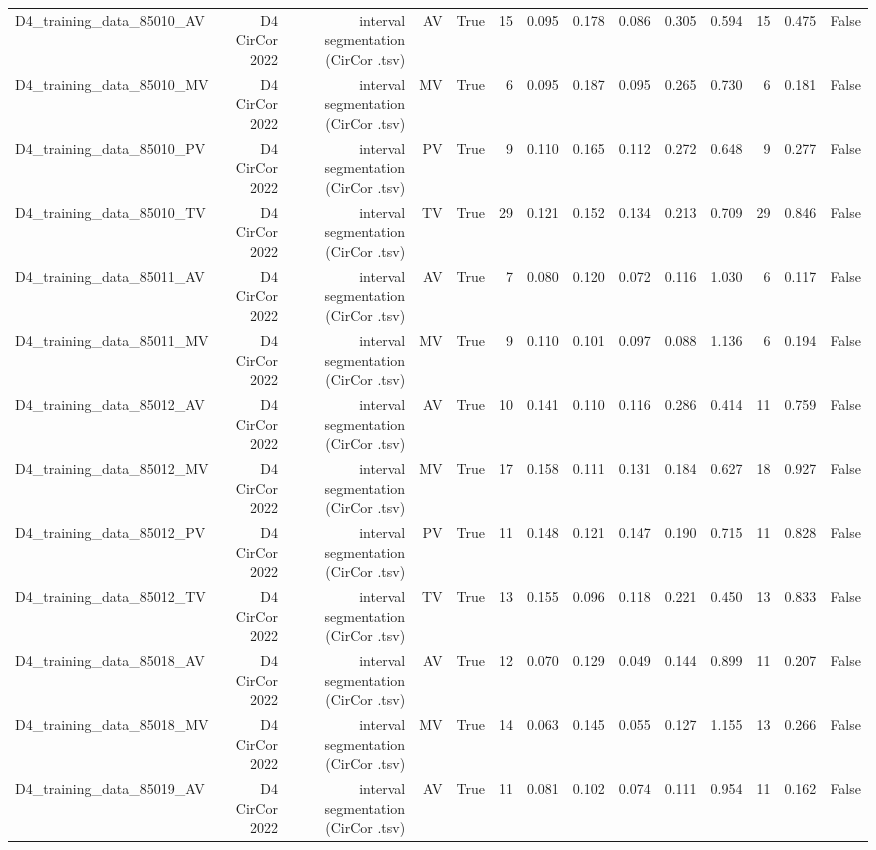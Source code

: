 \begin{table}[htbp]
\begin{tabular}{lrrrrrrrrrrrrr}
    D4\_training\_data\_85010\_AV & D4 CirCor 2022 & interval segmentation (CirCor .tsv) & AV & True & 15 & 0.095 & 0.178 & 0.086 & 0.305 & 0.594 & 15 & 0.475 & False \\
    D4\_training\_data\_85010\_MV & D4 CirCor 2022 & interval segmentation (CirCor .tsv) & MV & True & 6 & 0.095 & 0.187 & 0.095 & 0.265 & 0.730 & 6 & 0.181 & False \\
    D4\_training\_data\_85010\_PV & D4 CirCor 2022 & interval segmentation (CirCor .tsv) & PV & True & 9 & 0.110 & 0.165 & 0.112 & 0.272 & 0.648 & 9 & 0.277 & False \\
    D4\_training\_data\_85010\_TV & D4 CirCor 2022 & interval segmentation (CirCor .tsv) & TV & True & 29 & 0.121 & 0.152 & 0.134 & 0.213 & 0.709 & 29 & 0.846 & False \\
    D4\_training\_data\_85011\_AV & D4 CirCor 2022 & interval segmentation (CirCor .tsv) & AV & True & 7 & 0.080 & 0.120 & 0.072 & 0.116 & 1.030 & 6 & 0.117 & False \\
    D4\_training\_data\_85011\_MV & D4 CirCor 2022 & interval segmentation (CirCor .tsv) & MV & True & 9 & 0.110 & 0.101 & 0.097 & 0.088 & 1.136 & 6 & 0.194 & False \\
    D4\_training\_data\_85012\_AV & D4 CirCor 2022 & interval segmentation (CirCor .tsv) & AV & True & 10 & 0.141 & 0.110 & 0.116 & 0.286 & 0.414 & 11 & 0.759 & False \\
    D4\_training\_data\_85012\_MV & D4 CirCor 2022 & interval segmentation (CirCor .tsv) & MV & True & 17 & 0.158 & 0.111 & 0.131 & 0.184 & 0.627 & 18 & 0.927 & False \\
    D4\_training\_data\_85012\_PV & D4 CirCor 2022 & interval segmentation (CirCor .tsv) & PV & True & 11 & 0.148 & 0.121 & 0.147 & 0.190 & 0.715 & 11 & 0.828 & False \\
    D4\_training\_data\_85012\_TV & D4 CirCor 2022 & interval segmentation (CirCor .tsv) & TV & True & 13 & 0.155 & 0.096 & 0.118 & 0.221 & 0.450 & 13 & 0.833 & False \\
    D4\_training\_data\_85018\_AV & D4 CirCor 2022 & interval segmentation (CirCor .tsv) & AV & True & 12 & 0.070 & 0.129 & 0.049 & 0.144 & 0.899 & 11 & 0.207 & False \\
    D4\_training\_data\_85018\_MV & D4 CirCor 2022 & interval segmentation (CirCor .tsv) & MV & True & 14 & 0.063 & 0.145 & 0.055 & 0.127 & 1.155 & 13 & 0.266 & False \\
    D4\_training\_data\_85019\_AV & D4 CirCor 2022 & interval segmentation (CirCor .tsv) & AV & True & 11 & 0.081 & 0.102 & 0.074 & 0.111 & 0.954 & 11 & 0.162 & False \\

\end{tabular}
\end{table}
